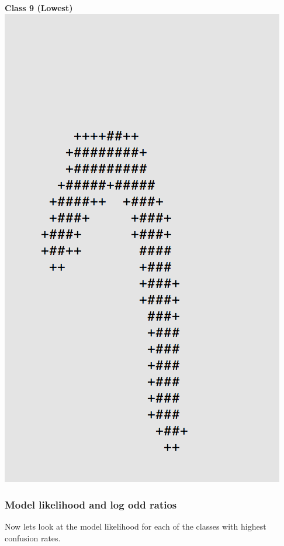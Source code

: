\documentclass[11pt]{article}
\begin{document}
\begin{center}
\begin{multicols}{2}
\textbf{Class 9 (Lowest)}\\
\includegraphics[scale=0.4]{part1/1/low_9.png}
\end{multicols}
\end{center}

\pagebreak
\subsubsection*{Model likelihood and log odd ratios}
Now lets look at the model likelihood for each of the classes with highest confusion rates.\\
\end{document}
